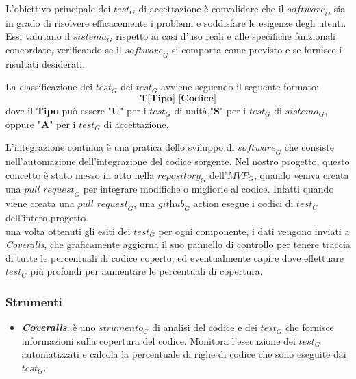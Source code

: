 L'obiettivo principale dei $\textit{test}_G$ di accettazione è convalidare che il $\textit{software}_G$ sia in grado di risolvere efficacemente i problemi e soddisfare le esigenze degli utenti. 
\\Essi valutano il $\textit{sistema}_G$ rispetto ai casi d'uso reali e alle specifiche funzionali concordate, verificando se il $\textit{software}_G$ si comporta come previsto e se fornisce i risultati desiderati.

La classificazione dei $\textit{test}_G$ dei $\textit{test}_G$ avviene seguendo il seguente formato:
\[
    \textbf{T[Tipo]-[Codice]}
\]
dove il \textbf{Tipo} può essere  "\textbf{U}" per i $\textit{test}_G$ di unità,"\textbf{S}" per i $\textit{test}_G$ di $\textit{sistema}_G$, oppure "\textbf{A}" per i $\textit{test}_G$ di accettazione.

L'integrazione continua è una pratica dello sviluppo di $\textit{software}_G$ che consiste nell'automazione dell'integrazione del codice sorgente.
Nel nostro progetto, questo concetto è stato messo in atto nella $\textit{repository}_G$ dell'$\textit{MVP}_G$, quando veniva creata una $\textit{pull request}_G$ per integrare modifiche o migliorie al codice.
Infatti quando viene creata una $\textit{pull request}_G$, una $\textit{github}_G$ action esegue i codici di $\textit{test}_G$ dell'intero progetto. 
\\una volta ottenuti gli esiti dei $\textit{test}_G$ per ogni componente, i dati vengono inviati a \textit{Coveralls}, che graficamente aggiorna il suo pannello di controllo per tenere traccia di tutte le percentuali di codice coperto, ed  eventualmente capire dove effettuare $\textit{test}_G$ più profondi per aumentare le percentuali di copertura.


\subsubsection{Strumenti}
\begin{itemize}
    \item \emph{\textbf{Coveralls}}: 
 è uno $\textit{strumento}_G$ di analisi del codice e dei $\textit{test}_G$ che fornisce informazioni sulla copertura del codice. Monitora l'esecuzione dei $\textit{test}_G$ automatizzati e calcola la percentuale di righe di codice che sono eseguite dai $\textit{test}_G$.
\end{itemize}

